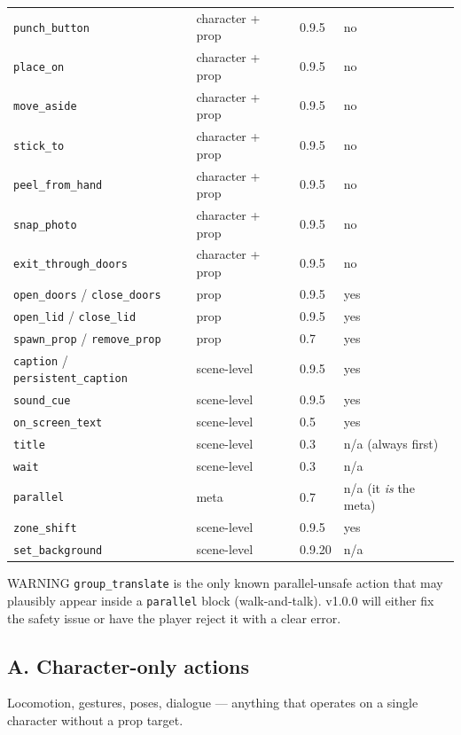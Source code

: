 \documentclass[
  11pt,
]{book}
\begin{document}
\begin{longtable}[]{@{}llll@{}}
\texttt{punch\_button} & character + prop & 0.9.5 & no \\
\texttt{place\_on} & character + prop & 0.9.5 & no \\
\texttt{move\_aside} & character + prop & 0.9.5 & no \\
\texttt{stick\_to} & character + prop & 0.9.5 & no \\
\texttt{peel\_from\_hand} & character + prop & 0.9.5 & no \\
\texttt{snap\_photo} & character + prop & 0.9.5 & no \\
\texttt{exit\_through\_doors} & character + prop & 0.9.5 & no \\
\texttt{open\_doors} / \texttt{close\_doors} & prop & 0.9.5 & yes \\
\texttt{open\_lid} / \texttt{close\_lid} & prop & 0.9.5 & yes \\
\texttt{spawn\_prop} / \texttt{remove\_prop} & prop & 0.7 & yes \\
\texttt{caption} / \texttt{persistent\_caption} & scene-level & 0.9.5 &
yes \\
\texttt{sound\_cue} & scene-level & 0.9.5 & yes \\
\texttt{on\_screen\_text} & scene-level & 0.5 & yes \\
\texttt{title} & scene-level & 0.3 & n/a (always first) \\
\texttt{wait} & scene-level & 0.3 & n/a \\
\texttt{parallel} & meta & 0.7 & n/a (it \emph{is} the meta) \\
\texttt{zone\_shift} & scene-level & 0.9.5 & yes \\
\texttt{set\_background} & scene-level & 0.9.20 & n/a \\
\end{longtable}

WARNING \texttt{group\_translate} is the only known parallel-unsafe
action that may plausibly appear inside a \texttt{parallel} block
(walk-and-talk). v1.0.0 will either fix the safety issue or have the
player reject it with a clear error.

\subsection{A. Character-only actions}\label{a.-character-only-actions}

Locomotion, gestures, poses, dialogue --- anything that operates on a
single character without a prop target.
\end{document}
